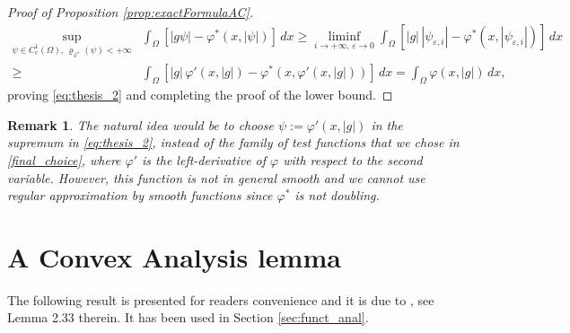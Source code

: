 \documentclass[a4paper,11pt,oneside,notitlepage]{article}
\newtheorem{remark}[theorem]{Remark}
\numberwithin{equation}{section}
\newcommand{\e}{\varepsilon}
\newcommand{\vphi}{\varphi}
\newcommand{\vrho}{\varrho}
\begin{document}
\begin{proof}[Proof of Proposition \ref{prop:exactFormulaAC}]
    \begin{equation*}
    \begin{aligned}
        \sup_{\psi \in C^1_c(\Omega), \, \vrho_{\vphi^*}(\psi) < +\infty} &\int_\Omega [|g \psi| - \vphi^*(x, |\psi|)] \, dx \ge \liminf_{i \to +\infty, \, \e \to 0} \int_\Omega [|g| \, |\psi_{\e,i}| - \vphi^*(x, |\psi_{\e,i}|)]\, dx \\
        \ge &\int_\Omega [|g| \, \vphi'(x, |g|) - \vphi^*(x, \vphi'(x, |g|))] \, dx = \int_\Omega \vphi(x, |g|) \, dx,
    \end{aligned}
    \end{equation*}
    proving \eqref{eq:thesis_2} and completing the proof of the lower bound.
\end{proof}

\begin{remark}
    The natural idea would be to choose $\psi := \vphi'(x, |g|)$ in the supremum in \eqref{eq:thesis_2}, instead of the family of test functions that we chose in \eqref{final_choice}, where $\vphi'$ is the left-derivative of $\vphi$ with respect to the second variable. However, this function is not in general smooth and we cannot use regular approximation by smooth functions since $\vphi^*$ is not doubling.
\end{remark}


\section{A Convex Analysis lemma}
\label{AmarLemma}

The following result is presented for readers convenience and it is due to \cite{Aapp}, see Lemma 2.33 therein. It has been used in Section \ref{sec:funct_anal}.
\end{document}

